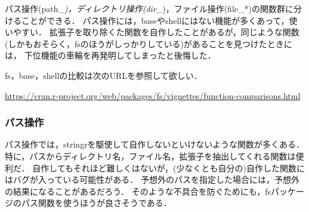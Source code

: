 \documentclass[
]{article}
\begin{document}
パス操作(path\_\emph{)，ディレクトリ操作(dir\_})，ファイル操作(file\_*)の関数群に分けることができる．
パス操作には，baseやshellにはない機能が多くあって，使いやすい．
拡張子を取り除くた関数を自作したことがあるが，同じような関数(しかもおそらく，fsのほうがしっかりしている)があることを見つけたときには，
下位機能の車輪を再発明してしまったと後悔した．

fs，base，shellの比較は次のURLを参照して欲しい．

\url{https://cran.r-project.org/web/packages/fs/vignettes/function-comparisons.html}

\hypertarget{ux30d1ux30b9ux64cdux4f5c}{%
\subsubsection{パス操作}\label{ux30d1ux30b9ux64cdux4f5c}}

パス操作では，stringrを駆使して自作しないといけないような関数が多くある．
特に，パスからディレクトリ名，ファイル名，拡張子を抽出してくれる関数は便利だ．
自作してもそれほど難しくはないが，(少なくとも自分の)自作した関数にはバグが入っている可能性がある．
予想外のパスを指定した場合には，予想外の結果になることがあるだろう．
そのような不具合を防ぐためにも，fsパッケージのパス関数を使うほうが良さそうである．
\end{document}
